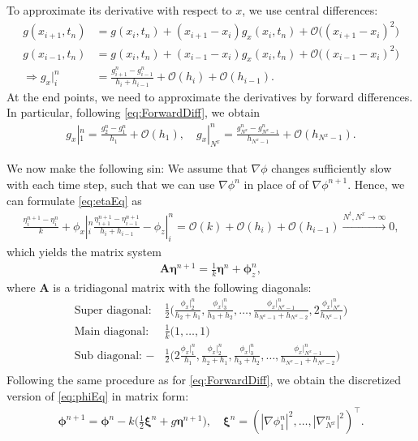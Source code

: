 \documentclass[11pt]{article}
\begin{document}
To approximate its derivative with respect to $x$, we use central differences:
\begin{align*}
    g(x_{i+1}, t_n)       & = g(x_i, t_n) +  (x_{i+1}-x_i)g_x(x_i, t_n) + \mathcal{O}\big((x_{i+1}-x_i)^2\big) \\
    g(x_{i-1}, t_n)       & = g(x_i, t_n) +  (x_{i-1}-x_i)g_x(x_i, t_n) + \mathcal{O}\big((x_{i-1}-x_i)^2\big) \\    
    \Rightarrow g_x|_i^n & = \frac{g_{i+1}^n-g_{i-1}^n}{h_i + h_{i-1}} + \mathcal{O}(h_i) + \mathcal{O}(h_{i-1}).
\end{align*}
At the end points, we need to approximate the derivatives by forward differences. In particular, following \eqref{eq:ForwardDiff}, 
we obtain
\begin{align*}
    g_x|_1^n = \frac{g_2^n -g_1^n}{h_1} + \mathcal{O}(h_1), \quad g_x|_{N^x}^n = \frac{g_{N^x}^n -g_{N^x-1}^n}{h_{N^x-1}} + \mathcal{O}(h_{N^x-1}).
\end{align*}

We now make the following sin: We assume that $\nabla \phi$ changes sufficiently slow with each time step, such that we can use $\nabla \phi^n$
in place of of $\nabla \phi^{n+1}$. Hence, we can formulate \eqref{eq:etaEq} as
\begin{align*}
    \frac{\eta_i^{n+1} - \eta_i^n}{k} + \phi_x|_i^{n} \frac{\eta_{i+1}^{n+1}-\eta_{i-1}^{n+1}}{h_i + h_{i-1}} - \phi_z|_i^n
                       = \mathcal{O}(k) + \mathcal{O}(h_i) + \mathcal{O}(h_{i-1}) \xrightarrow{N^t, N^x \rightarrow \infty} 0,
\end{align*}
which yields the matrix system
\begin{align}
    \label{eq:etan+1}
    \bm{A} \bm{\eta}^{n+1} = \frac{1}{k}\bm{\eta}^n + \bm{\phi}_z^n,
\end{align}
where $\bm{A}$ is a tridiagonal matrix with the following diagonals:
\begin{align*}
    \text{Super diagonal: } &\frac{1}{2} \bigg(\frac{\phi_x|_2^{n}}{h_2 + h_1}, \frac{\phi_x|_3^{n}}{h_3+h_2},
                                        \dots, \frac{\phi_x|_{N^x-1}^n}{h_{N^x-1} + h_{N^x-2}}, 2\frac{\phi_x|_{N^x}^n}{h_{N^x-1}}\bigg) \\
    \text{Main diagonal: }  &\frac{1}{k}  \Big(1, \dots, 1\Big)                                        \\
    \text{Sub diagonal: }  -&\frac{1}{2} \bigg(2\frac{\phi_x|_1^{n}}{h_1}, \frac{\phi_x|_2^{n}}{h_2+h_1}, \frac{\phi_x|_3^n}{h_3 + h_2},
                                        \dots, \frac{\phi_x|_{N^x-1}^n}{h_{N^x-1} + h_{N^x-2}}\bigg) \\
\end{align*}
Following the same procedure as for \eqref{eq:ForwardDiff}, we obtain the discretized version of \eqref{eq:phiEq} in matrix form:
\begin{align}
    \label{eq:phin+1}
    \bm{\phi}^{n+1} = \bm{\phi}^n - k\bigg(\frac{1}{2}\bm{\xi}^n + g \bm{\eta}^{n+1}\bigg), \quad \bm \xi ^{n} = \left( |\nabla \phi_1^n|^2,\ldots , |\nabla_{N^x}^n|^2 \right)^\top.
\end{align}
 
\end{document}
